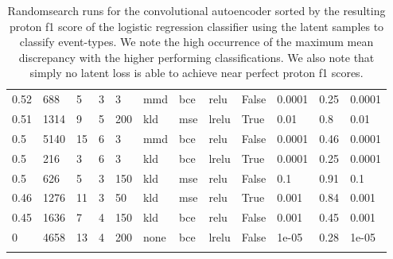 \begin{longtable}{llllllllllll}
           0.52 &          688 &              5 &        3 &                3 &         mmd &                 bce &                relu &     False &  0.0001 &      0.25 & 0.0001 \\
           0.51 &         1314 &              9 &        5 &              200 &         kld &                 mse &               lrelu &      True &    0.01 &       0.8 &   0.01 \\
            0.5 &         5140 &             15 &        6 &                3 &         mmd &                 bce &                relu &     False &  0.0001 &      0.46 & 0.0001 \\
            0.5 &          216 &              3 &        6 &                3 &         kld &                 bce &               lrelu &      True &  0.0001 &      0.25 & 0.0001 \\
            0.5 &          626 &              5 &        3 &              150 &         kld &                 mse &                relu &     False &     0.1 &      0.91 &    0.1 \\
           0.46 &         1276 &             11 &        3 &               50 &         kld &                 mse &                relu &      True &   0.001 &      0.84 &  0.001 \\
           0.45 &         1636 &              7 &        4 &              150 &         kld &                 bce &                relu &     False &   0.001 &      0.45 &  0.001 \\
              0 &         4658 &             13 &        4 &              200 &        none &                 bce &               lrelu &     False &   1e-05 &      0.28 &  1e-05 \\
\bottomrule
\caption{Randomsearch runs for the convolutional autoencoder sorted by the resulting proton f1 score of the logistic regression classifier using the latent samples to classify event-types. We note the high occurrence of the maximum mean discrepancy with the higher performing classifications. We also note that simply no latent loss is able to achieve near perfect proton f1 scores.}\label{tab:convae_randomsearch}
\end{longtable}
